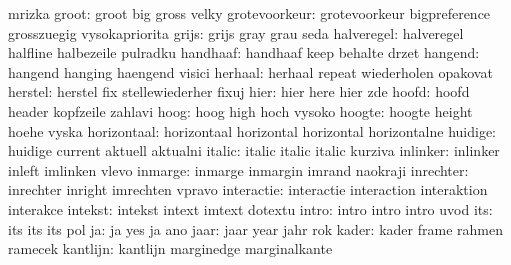                       mrizka
              groot:  groot                big                 gross
                      velky
      grotevoorkeur:  grotevoorkeur        bigpreference       grosszuegig
                      vysokapriorita
              grijs:  grijs                gray                grau
                      seda
         halveregel:  halveregel           halfline            halbezeile
                      pulradku
           handhaaf:  handhaaf             keep                behalte
                      drzet
            hangend:  hangend              hanging             haengend
                      visici
            herhaal:  herhaal              repeat              wiederholen
                      opakovat
            herstel:  herstel              fix                 stellewiederher
                      fixuj
               hier:  hier                 here                hier
                      zde
              hoofd:  hoofd                header              kopfzeile
                      zahlavi
               hoog:  hoog                 high                hoch
                      vysoko
             hoogte:  hoogte               height              hoehe
                      vyska
        horizontaal:  horizontaal          horizontal          horizontal
                      horizontalne
            huidige:  huidige              current             aktuell
                      aktualni
             italic:  italic               italic              italic
                      kurziva
           inlinker:  inlinker             inleft              imlinken
                      vlevo
            inmarge:  inmarge              inmargin            imrand
                      naokraji
          inrechter:  inrechter            inright             imrechten
                      vpravo
         interactie:  interactie           interaction         interaktion
                      interakce
            intekst:  intekst              intext              imtext
                      dotextu
              intro:  intro                intro               intro
                      uvod
                its:  its                  its                 its
                      pol
                 ja:  ja                   yes                 ja
                      ano
               jaar:  jaar                 year                jahr
                      rok
              kader:  kader                frame               rahmen
                      ramecek
           kantlijn:  kantlijn             marginedge          marginalkante
